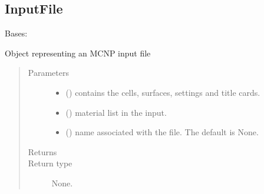 \documentclass[letterpaper,10pt,english]{sphinxmanual}
\begin{document}
\subsection{InputFile}
\label{\detokenize{api/inputgeneration:inputfile}}\label{\detokenize{api/inputgeneration:inputob}}

\begin{fulllineitems}
\label{\detokenize{api/inputgeneration:inputfile.InputFile}}
\sphinxAtStartPar
Bases: 

\sphinxAtStartPar
Object representing an MCNP input file
\begin{quote}\begin{description}
\item[{Parameters}] \leavevmode\begin{itemize}
\item {} 
\sphinxAtStartPar
{} () \textendash{} contains the cells, surfaces, settings and title cards.

\item {} 
\sphinxAtStartPar
{} () \textendash{} material list in the input.

\item {} 
\sphinxAtStartPar
{} (\sphinxstyleliteralemphasis{\sphinxupquote{, }}) \textendash{} name associated with the file. The default is None.

\end{itemize}

\item[{Returns}] \leavevmode
\sphinxAtStartPar


\item[{Return type}] \leavevmode
\sphinxAtStartPar
None.

\end{description}\end{quote}


\end{fulllineitems}
\end{document}

